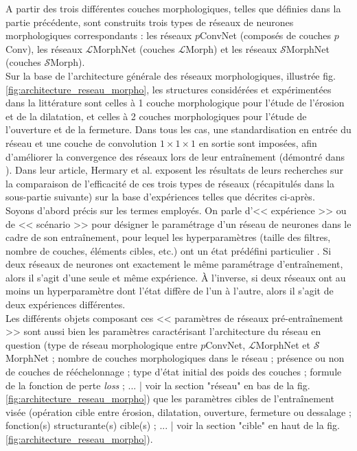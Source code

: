 A partir des trois différentes couches morphologiques, telles que définies dans la partie précédente, sont construits trois types de réseaux de neurones morphologiques correspondants : les réseaux $p$ConvNet (composés de couches $p$Conv), les réseaux $\mathcal{L}$MorphNet (couches $\mathcal{L}$Morph) et les réseaux $\mathcal{S}$MorphNet (couches $\mathcal{S}$Morph). \\

\vspace{-2.0mm}
\noindent Sur la base de l'architecture générale des réseaux morphologiques, illustrée fig. \ref{fig:architecture_reseau_morpho}, les structures considérées et expérimentées dans la littérature \cite{Kirszenberg_2021, Hermary_2022} sont celles à 1 couche morphologique pour l'étude de l'érosion et de la dilatation, et celles à 2 couches morphologiques pour l'étude de l'ouverture et de la fermeture. Dans tous les cas, une standardisation en entrée du réseau et une couche de convolution $1 \times 1 \times 1$ en sortie sont imposées, afin d'améliorer la convergence des réseaux lors de leur entraînement (démontré dans \cite{Hermary_2022}). Dans leur article, Hermary et al. exposent les résultats de leurs recherches sur la comparaison de l'efficacité de ces trois types de réseaux (récapitulés dans la sous-partie suivante) sur la base d'expériences telles que décrites ci-après. \\

\vspace{-1.4mm}
Soyons d'abord précis sur les termes employés. On parle d'<< expérience >> ou de << scénario >> pour désigner le paramétrage d'un réseau de neurones dans le cadre de son entraînement, pour lequel les hyperparamètres (taille des filtres, nombre de couches, éléments cibles, etc.) ont un état prédéfini particulier \cite{Keiller_2019}. Si deux réseaux de neurones ont exactement le même paramétrage d'entraînement, alors il s'agit d'une seule et même expérience. À l'inverse, si deux réseaux ont au moins un hyperparamètre dont l'état diffère de l'un à l'autre, alors il s'agit de deux expériences différentes. \\

\vspace{-2.0mm}
\noindent Les différents objets composant ces << paramètres de réseaux pré-entraînement >> sont aussi bien les paramètres caractérisant l'architecture du réseau en question (type de réseau morphologique entre $p$ConvNet, $\mathcal{L}$MorphNet et $\mathcal{S}$MorphNet ; nombre de couches morphologiques dans le réseau ; présence ou non de couches de rééchelonnage ; type d'état initial des poids des couches ; formule de la fonction de perte \textit{loss} ; ... | voir la section "réseau" en bas de la fig. \ref{fig:architecture_reseau_morpho}) que les paramètres cibles de l'entraînement visée (opération cible entre érosion, dilatation, ouverture, fermeture ou dessalage ; fonction(s) structurante(s) cible(s) ; ... | voir la section "cible" en haut de la fig. \ref{fig:architecture_reseau_morpho}). \\

